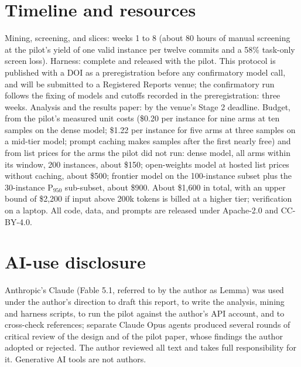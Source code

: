 \documentclass[10pt,conference]{IEEEtran}
\begin{document}
\section{Timeline and resources}

Mining, screening, and slices: weeks 1 to 8 (about 80 hours of manual screening at the pilot's yield of one valid instance per twelve commits and a 58\% task-only screen loss). Harness: complete and released with the pilot. This protocol is published with a DOI as a preregistration before any confirmatory model call, and will be submitted to a Registered Reports venue; the confirmatory run follows the fixing of models and cutoffs recorded in the preregistration: three weeks. Analysis and the results paper: by the venue's Stage 2 deadline. Budget, from the pilot's measured unit costs (\$0.20 per instance for nine arms at ten samples on the dense model; \$1.22 per instance for five arms at three samples on a mid-tier model; prompt caching makes samples after the first nearly free) and from list prices for the arms the pilot did not run: dense model, all arms within its window, 200 instances, about \$150; open-weights model at hosted list prices without caching, about \$500; frontier model on the 100-instance subset plus the 30-instance P$_{950}$ sub-subset, about \$900. About \$1,600 in total, with an upper bound of \$2,200 if input above 200k tokens is billed at a higher tier; verification on a laptop. All code, data, and prompts are released under Apache-2.0 and CC-BY-4.0.

\section*{AI-use disclosure}
Anthropic's Claude (Fable 5.1, referred to by the author as Lemma) was used under the author's direction to draft this report, to write the analysis, mining and harness scripts, to run the pilot against the author's API account, and to cross-check references; separate Claude Opus agents produced several rounds of critical review of the design and of the pilot paper, whose findings the author adopted or rejected. The author reviewed all text and takes full responsibility for it. Generative AI tools are not authors.



\end{document}
